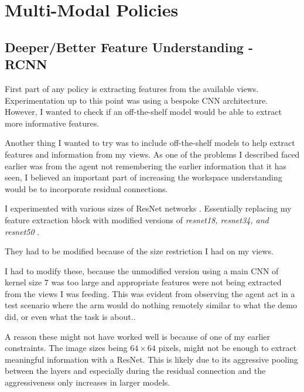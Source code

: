 \section{Multi-Modal Policies}
\subsection{Deeper/Better Feature Understanding - RCNN}
First part of any policy is extracting features from the available views. Experimentation up to this point was using a bespoke CNN architecture. However, I wanted to check if an off-the-shelf model would be able to extract more informative features.

Another thing I wanted to try was to include off-the-shelf models to help extract features and information from my views. As one of the problems I described faced earlier was from the agent not remembering the earlier information that it has seen, I believed an important part of increasing the workspace understanding would be to incorporate residual connections.

I experimented with various sizes of ResNet networks . Essentially replacing my feature extraction block with modified versions of \emph{resnet18, resnet34, and resnet50} .

They had to be modified because of the size restriction I had on my views.

I had to modify these, because the unmodified version using a main CNN of kernel size $7$ was too large and appropriate features were not being extracted from the views I was feeding. This was evident from observing the agent act in a test scenario where the arm would do nothing remotely similar to what the demo did, or even what the task is about.. 



A reason these might not have worked well is because of one of my earlier constraints. The image sizes being \(64 \times 64\) pixels, might not be enough to extract meaningful information with a ResNet. This is likely due to its aggressive pooling between the layers and especially during the residual connection and the aggressiveness only increases in larger models.  

